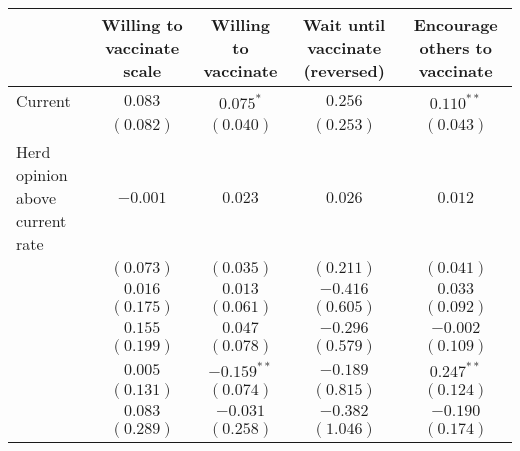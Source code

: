 \begin{table}
\begin{center}
\begin{tabular}{l c c c c}
\hline
 & Willing to vaccinate scale & Willing to vaccinate & Wait until vaccinate (reversed) & Encourage others to vaccinate \\
\hline
Current                                          & $0.083$                      & $0.075^{*}$    & $0.256$                       & $0.110^{**}$   \\
                                                 & $(0.082)$                    & $(0.040)$      & $(0.253)$                     & $(0.043)$      \\
Herd opinion above current rate                  & $-0.001$                     & $0.023$        & $0.026$                       & $0.012$        \\
                                                 & $(0.073)$                    & $(0.035)$      & $(0.211)$                     & $(0.041)$      \\
                                                 & $0.016$                      & $0.013$        & $-0.416$                      & $0.033$        \\
                                                 & $(0.175)$                    & $(0.061)$      & $(0.605)$                     & $(0.092)$      \\
                                                 & $0.155$                      & $0.047$        & $-0.296$                      & $-0.002$       \\
                                                 & $(0.199)$                    & $(0.078)$      & $(0.579)$                     & $(0.109)$      \\
                                                 & $0.005$                      & $-0.159^{**}$  & $-0.189$                      & $0.247^{**}$   \\
                                                 & $(0.131)$                    & $(0.074)$      & $(0.815)$                     & $(0.124)$      \\
                                                 & $0.083$                      & $-0.031$       & $-0.382$                      & $-0.190$       \\
                                                 & $(0.289)$                    & $(0.258)$      & $(1.046)$                     & $(0.174)$      \\

\end{tabular}
\end{center}
\end{table}
